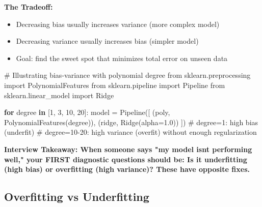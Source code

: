 \documentclass[11pt]{article}
\providecommand{\tightlist}{\setlength{\itemsep}{1pt}\setlength{\parskip}{0pt}}
\newenvironment{Shaded}{\begin{snugshade}}{\end{snugshade}}
\newcommand{\CommentTok}[1]{\textcolor[rgb]{0.48,0.49,0.49}{#1}}
\newcommand{\ControlFlowTok}[1]{\textcolor[rgb]{0.99,0.74,0.29}{\textbf{#1}}}
\newcommand{\DecValTok}[1]{\textcolor[rgb]{0.96,0.45,0.00}{#1}}
\newcommand{\FloatTok}[1]{\textcolor[rgb]{0.96,0.45,0.00}{#1}}
\newcommand{\ImportTok}[1]{\textcolor[rgb]{0.15,0.68,0.38}{#1}}
\newcommand{\KeywordTok}[1]{\textcolor[rgb]{0.81,0.81,0.76}{\textbf{#1}}}
\newcommand{\NormalTok}[1]{\textcolor[rgb]{0.81,0.81,0.76}{#1}}
\newcommand{\OperatorTok}[1]{\textcolor[rgb]{0.81,0.81,0.76}{#1}}
\newcommand{\StringTok}[1]{\textcolor[rgb]{0.96,0.31,0.31}{#1}}
\begin{document}
\textbf{The Tradeoff:}

\begin{itemize}
\tightlist
\item
  Decreasing bias usually increases variance (more complex model)
\item
  Decreasing variance usually increases bias (simpler model)
\item
  Goal: find the sweet spot that minimizes total error on unseen data
\end{itemize}


\begin{Shaded}
\begin{Highlighting}[]
\CommentTok{\# Illustrating bias{-}variance with polynomial degree}
\ImportTok{from}\NormalTok{ sklearn.preprocessing }\ImportTok{import}\NormalTok{ PolynomialFeatures}
\ImportTok{from}\NormalTok{ sklearn.pipeline }\ImportTok{import}\NormalTok{ Pipeline}
\ImportTok{from}\NormalTok{ sklearn.linear\_model }\ImportTok{import}\NormalTok{ Ridge}

\ControlFlowTok{for}\NormalTok{ degree }\KeywordTok{in}\NormalTok{ [}\DecValTok{1}\NormalTok{, }\DecValTok{3}\NormalTok{, }\DecValTok{10}\NormalTok{, }\DecValTok{20}\NormalTok{]:}
\NormalTok{    model }\OperatorTok{=}\NormalTok{ Pipeline([}
\NormalTok{        (}\StringTok{\textquotesingle{}poly\textquotesingle{}}\NormalTok{, PolynomialFeatures(degree)),}
\NormalTok{        (}\StringTok{\textquotesingle{}ridge\textquotesingle{}}\NormalTok{, Ridge(alpha}\OperatorTok{=}\FloatTok{1.0}\NormalTok{))}
\NormalTok{    ])}
    \CommentTok{\# degree=1: high bias (underfit)}
    \CommentTok{\# degree=10{-}20: high variance (overfit) without enough regularization}
\end{Highlighting}
\end{Shaded}

\textbf{Interview Takeaway: When someone says "my model isn\textquotesingle t performing well," your FIRST diagnostic questions should be: Is it underfitting (high bias) or overfitting (high variance)? These have opposite fixes.}

\subsection{Overfitting vs Underfitting}\label{overfitting-vs-underfitting}
\end{document}
